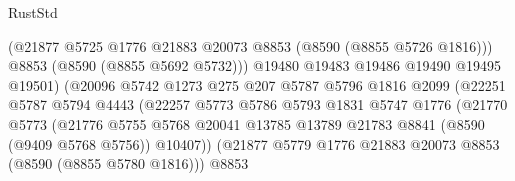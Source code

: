 \begin{lexlean}{RustStd}
\begin{coremodule}
                                      (@21877
                                        @5725
                                        @1776
                                        @21883
                                        @20073
                                        @8853
                                        (@8590 (@8855 @5726 @1816)))
                                      @8853
                                      (@8590 (@8855 @5692 @5732)))
                                    @19480
                                    @19483
                                    @19486
                                    @19490
                                    @19495
                                    @19501)
                                  (@20096
                                    @5742
                                    @1273
                                    @275
                                    @207
                                    @5787
                                    @5796
                                    @1816
                                    @2099
                                    (@22251
                                      @5787
                                      @5794
                                      @4443
                                      (@22257
                                        @5773
                                        @5786
                                        @5793
                                        @1831
                                        @5747
                                        @1776
                                        (@21770
                                          @5773
                                          (@21776
                                            @5755
                                            @5768
                                            @20041
                                            @13785
                                            @13789
                                            @21783
                                            @8841
                                            (@8590 (@9409 @5768 @5756))
                                            @10407))
                                        (@21877
                                          @5779
                                          @1776
                                          @21883
                                          @20073
                                          @8853
                                          (@8590 (@8855 @5780 @1816)))
                                        @8853

\end{coremodule}
\end{lexlean}

